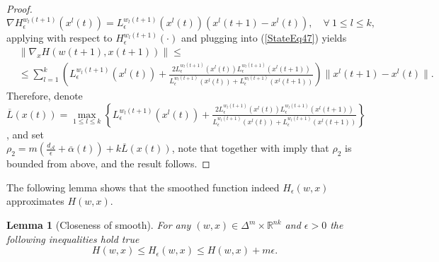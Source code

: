\documentclass[11pt]{article}
\numberwithin{equation}{section}
\newtheorem{lemma}{Lemma}[proposition]
\begin{document}
\begin{proof}
\begin{equation*}
\nabla H_{\epsilon}^{w_l(t+1)}(x^l(t)) = L_{\epsilon}^{w_l(t+1)}(x^l(t)) \left( x^l(t+1) - x^l(t) \right) , \quad \forall \: 1 \leq l \leq k,
\end{equation*}
applying  with respect to $H_{\epsilon}^{w_l(t+1)}(\cdot)$ and plugging into (\ref{StateEq47}) yields
\begin{equation*}
\begin{aligned}
	&\| \nabla_x H(w(t+1),x(t+1)) \| \leq \\
	&\leq \sum\limits_{l=1}^{k} \left( L_{\epsilon}^{w_l(t+1)}(x^l(t)) + \frac{2 L_{\epsilon}^{w_l(t+1)}(x^l(t)) L_{\epsilon}^{w_l(t+1)}(x^l(t+1))}{L_{\epsilon}^{w_l(t+1)}(x^l(t)) + L_{\epsilon}^{w_l(t+1)}(x^l(t+1))} \right) \|x^l(t+1) - x^l(t)\| .
\end{aligned}
\end{equation*}
Therefore, denote $\overline{L}(x(t)) = \max\limits_{1 \leq l \leq k} \left\lbrace L_{\epsilon}^{w_l(t+1)}(x^l(t)) + \frac{2 L_{\epsilon}^{w_l(t+1)}(x^l(t)) L_{\epsilon}^{w_l(t+1)}(x^l(t+1))}{L_{\epsilon}^{w_l(t+1)}(x^l(t)) + L_{\epsilon}^{w_l(t+1)}(x^l(t+1))} \right\rbrace$, and set \\ $\rho_2 = m \left( \frac{d_{\mathcal{A}}}{\epsilon} + \overline{\alpha}(t) \right) + k\overline{L}(x(t))$, note that  together with   imply that $\rho_2$ is bounded from above, and the result follows.
\end{proof}

The following lemma shows that the smoothed function indeed $H_{\epsilon}(w,x)$ approximates $H(w,x)$.

\begin{lemma}[Closeness of smooth]
For any $(w,x) \in {\Delta}^m \times \mathbb{R}^{nk}$ and $\epsilon > 0$ the following inequalities hold true
\begin{equation*}
	H(w,x) \leq H_{\epsilon}(w,x) \leq H(w,x) + m\epsilon .
\end{equation*}
\end{lemma}
\end{document}
